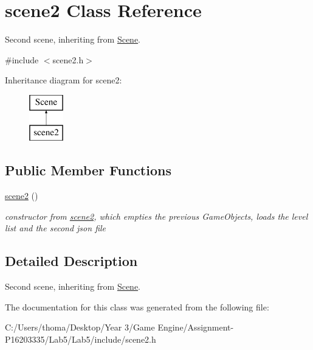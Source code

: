 \hypertarget{classscene2}{}\section{scene2 Class Reference}
\label{classscene2}


Second scene, inheriting from \mbox{\hyperlink{class_scene}{Scene}}.  




{\ttfamily \#include $<$scene2.\+h$>$}

Inheritance diagram for scene2\+:\begin{figure}[H]
\begin{center}
\leavevmode
\includegraphics[height=2.000000cm]{classscene2}
\end{center}
\end{figure}
\subsection*{Public Member Functions}
\begin{DoxyCompactItemize}
\item 
\mbox{\label{classscene2_a152e0f6aa8a5cb83fbf3e40d532df782}} 
\mbox{\hyperlink{classscene2_a152e0f6aa8a5cb83fbf3e40d532df782}{scene2}} ()
\begin{DoxyCompactList}\small\item\em constructor from \mbox{\hyperlink{classscene2}{scene2}}, which empties the previous Game\+Objects, loads the level list and the second json file \end{DoxyCompactList}\end{DoxyCompactItemize}


\subsection{Detailed Description}
Second scene, inheriting from \mbox{\hyperlink{class_scene}{Scene}}. 

The documentation for this class was generated from the following file\+:\begin{DoxyCompactItemize}
\item 
C\+:/\+Users/thoma/\+Desktop/\+Year 3/\+Game Engine/\+Assignment-\/\+P16203335/\+Lab5/\+Lab5/include/scene2.\+h\end{DoxyCompactItemize}
